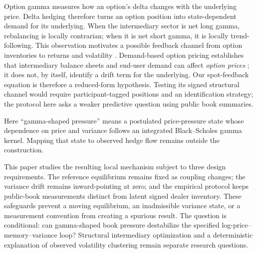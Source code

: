 \documentclass[11pt]{article}
\begin{document}
Option gamma measures how an option's delta changes with the underlying price.  Delta
hedging therefore turns an option position into state-dependent demand for its underlying.
When the intermediary sector is net long gamma, rebalancing is locally contrarian; when it
is net short gamma, it is locally trend-following.  This observation motivates a possible
feedback channel from option inventories to returns and volatility
\citep{freystremme1997,sircarpapanicolaou1998,platenschweizer1998}.  Demand-based option
pricing establishes that intermediary balance sheets and end-user demand can affect
\emph{option prices} \citep{garleanu2009demand}; it does not, by itself, identify a drift
term for the underlying.  Our spot-feedback equation is therefore a reduced-form hypothesis.
Testing its signed structural channel would require participant-tagged positions and an
identification strategy; the protocol here asks a weaker predictive question using public
book summaries.

Here ``gamma-shaped pressure'' means a postulated price-pressure state whose dependence on
price and variance follows an integrated Black--Scholes gamma kernel.  Mapping that state to
observed hedge flow remains outside the construction.

This paper studies the resulting local mechanism subject to three design requirements.
The reference equilibrium remains fixed as coupling changes; the variance drift remains
inward-pointing at zero; and the empirical protocol keeps public-book measurements distinct
from latent signed dealer inventory.  These safeguards prevent a moving equilibrium, an
inadmissible variance state, or a measurement convention from creating a spurious result.
The question is conditional: can gamma-shaped book pressure destabilize the specified
log-price--memory--variance loop?  Structural intermediary optimization and a deterministic
explanation of observed volatility clustering remain separate research questions.
\end{document}
